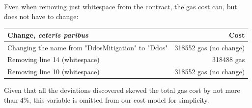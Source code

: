 Even when removing just whitespace from the contract, the gas cost can, but does not have to change:

\begin{center}
  \begin{tabular}{ l | r }
    \hline
    \textbf{Change, \textit{ceteris paribus}} & \textbf{Cost} \\ \hline
    Changing the name from "DdosMitigation" to "Ddos" & 318552 gas (no change) \\ \hline
    Removing line 14 (whitespace) & 318488 gas \\ \hline
    Removing line 10 (whitespace) & 318552 gas (no change) \\
    \hline
  \end{tabular}
\end{center}

Given that all the deviations discovered skewed the total gas cost by not more than 4\%, this variable is omitted from our cost model for simplicity.
